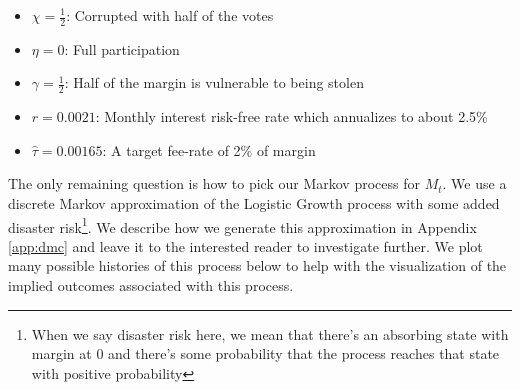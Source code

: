 \begin{itemize}
  \item $\chi = \frac{1}{2}$: Corrupted with half of the votes
  \item $\eta = 0$: Full participation
  \item $\gamma = \frac{1}{2}$: Half of the margin is vulnerable to being stolen
  \item $r = 0.0021$: Monthly interest risk-free rate which annualizes to about 2.5\%
  \item $\hat{\tau} = 0.00165$: A target fee-rate of 2\% of margin
\end{itemize}

The only remaining question is how to pick our Markov process for $M_t$. We use a discrete Markov
approximation of the Logistic Growth process with some added disaster risk\footnote{When we say
disaster risk here, we mean that there's an absorbing state with margin at 0 and there's some
probability that the process reaches that state with positive probability}. We describe how we
generate this approximation in Appendix \ref{app:dmc} and leave it to the interested reader to
investigate further. We plot many possible histories of this process below to help with the
visualization of the implied outcomes associated with this process.

\begin{center}
  \begin{figure}[H]
    \label{fig:sm_stochastic_margin_growth}
  \end{figure}
\end{center}

